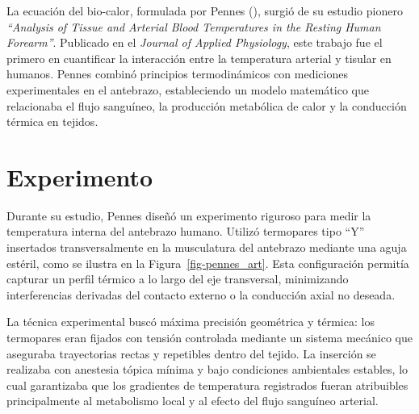 \documentclass[
  spanish,
  us-letterpaper,
  DIV=11,
  numbers=noendperiod]{scrreprt}
\theoremstyle{plain}
\theoremstyle{definition}
\theoremstyle{remark}
\begin{document}
La ecuación del bio-calor, formulada por Pennes
(), surgió de su estudio pionero
\emph{``Analysis of Tissue and Arterial Blood Temperatures in the
Resting Human Forearm''}. Publicado en el \emph{Journal of Applied
Physiology}, este trabajo fue el primero en cuantificar la interacción
entre la temperatura arterial y tisular en humanos. Pennes combinó
principios termodinámicos con mediciones experimentales en el antebrazo,
estableciendo un modelo matemático que relacionaba el flujo sanguíneo,
la producción metabólica de calor y la conducción térmica en tejidos.

\section*{Experimento}\label{experimento}


Durante su estudio, Pennes diseñó un experimento riguroso para medir la
temperatura interna del antebrazo humano. Utilizó termopares tipo ``Y''
insertados transversalmente en la musculatura del antebrazo mediante una
aguja estéril, como se ilustra en la Figura~\ref{fig-pennes_art}. Esta
configuración permitía capturar un perfil térmico a lo largo del eje
transversal, minimizando interferencias derivadas del contacto externo o
la conducción axial no deseada.

La técnica experimental buscó máxima precisión geométrica y térmica: los
termopares eran fijados con tensión controlada mediante un sistema
mecánico que aseguraba trayectorias rectas y repetibles dentro del
tejido. La inserción se realizaba con anestesia tópica mínima y bajo
condiciones ambientales estables, lo cual garantizaba que los gradientes
de temperatura registrados fueran atribuibles principalmente al
metabolismo local y al efecto del flujo sanguíneo arterial.
\end{document}
